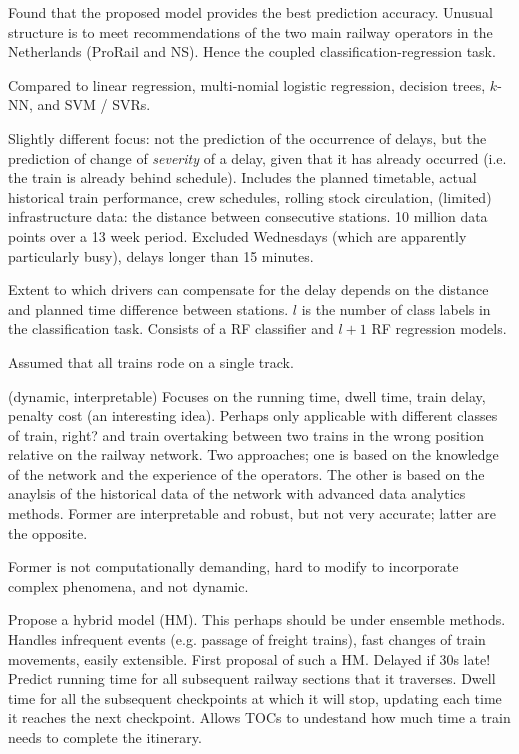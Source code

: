 \documentclass{article}
\begin{document}
Found that the proposed model provides the best prediction accuracy. Unusual structure is to meet recommendations of the two main railway operators in the Netherlands (ProRail and NS). Hence the coupled classification-regression task. 

Compared to linear regression, multi-nomial logistic regression, decision trees, $k$-NN, and SVM / SVRs. 

Slightly different focus: not the prediction of the occurrence of delays, but the prediction of change of \textit{severity} of a delay, given that it has already occurred (i.e. the train is already behind schedule). Includes the planned timetable, actual historical train performance, crew schedules, rolling stock circulation, (limited) infrastructure data: the distance between consecutive stations.
10 million data points over a 13 week period. Excluded Wednesdays (which are apparently particularly busy), delays longer than 15 minutes.

Extent to which drivers can compensate for the delay depends on the distance and planned time difference between stations. 
$l$ is the number of class labels in the classification task. Consists of a RF classifier and $l + 1$ RF regression models.

Assumed that all trains rode on a single track.

\cite{oneto_et_al_2018} (dynamic, interpretable) Focuses on the running time, dwell time, train delay, penalty cost (an interesting idea). Perhaps only applicable with different classes of train, right? and train overtaking between two trains in the wrong position relative on the railway network. Two approaches; one is based on the knowledge of the network and the experience of the operators. The other is based on the anaylsis of the historical data of the network with advanced data analytics methods. Former are interpretable and robust, but not very accurate; latter are the opposite. 

Former is not computationally demanding, hard to modify to incorporate complex phenomena, and not dynamic. 

Propose a hybrid model (HM). This perhaps should be under ensemble methods. Handles infrequent events (e.g. passage of freight trains), fast changes of train movements, easily extensible. First proposal of such a HM. Delayed if 30s late! 
Predict running time for all subsequent railway sections that it traverses. Dwell time for all the subsequent checkpoints at which it will stop, updating each time it reaches the next checkpoint. Allows TOCs to undestand how much time a train needs to complete the itinerary. 
\end{document}
